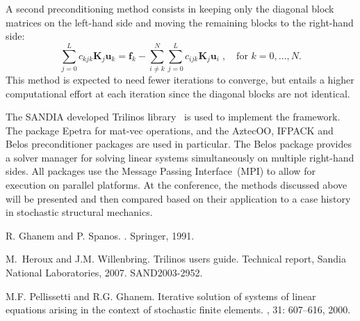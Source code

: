 \documentclass{report}
\begin{document}
A second preconditioning method consists in keeping only the diagonal
block matrices on the left-hand side and moving the remaining blocks to
the right-hand side:
\begin{equation}
\sum_{j=0}^{L}c_{kjk}\boldsymbol{K}_{j}\boldsymbol{u}_{k}=\boldsymbol{f}_{k}-\sum_{i\not=k}^{N}\sum_{j=0}^{L}c_{ijk}\boldsymbol{K}_{j}\boldsymbol{u}_{i}\;,\quad\text{for~$k
= 0,\ldots,N$}.
\end{equation}
This method is expected to need fewer iterations to converge, but entails
a higher computational effort at each iteration since the diagonal blocks
are not identical.

The SANDIA developed Trilinos library~\cite{heroux2007} is used to
implement the framework. The package Epetra for mat-vec operations, and
the AztecOO, IFPACK and Belos preconditioner packages are used in
particular. The Belos package provides a solver manager for solving
linear systems simultaneously on multiple right-hand sides. All packages
use the Message Passing Interface~(MPI) to allow for execution on
parallel platforms. At the conference, the methods discussed above will
be presented and then compared based on their application to a case
history in stochastic structural mechanics.

\begin{thebibliography}{99}
{R}. {G}hanem and {P}. {S}panos.
.
\newblock Springer, 1991.

M.~Heroux and J.M. Willenbring.
\newblock Trilinos users guide.
\newblock Technical report, Sandia National Laboratories, 2007.
\newblock SAND2003-2952.

M.F. Pellissetti and R.G. Ghanem.
\newblock Iterative solution of systems of linear equations arising in the
context of stochastic finite elements.
, 31: 607--616, 2000.
\end{thebibliography}
\end{document}
